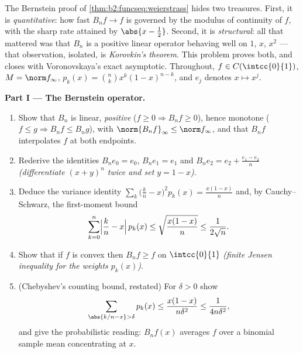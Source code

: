 \begin{problem}\label{pb:b2:funcseq:1}
The Bernstein proof of \cref{thm:b2:funcseq:weierstrass} hides
two treasures. First, it is \emph{quantitative}: how fast $B_nf
\to f$ is governed by the modulus of continuity of $f$, with the
sharp rate attained by $\abs{x - \frac12}$. Second, it is
\emph{structural}: all that mattered was that $B_n$ is a
positive linear operator behaving well on $1$, $x$, $x^2$ ---
that observation, isolated, is \emph{Korovkin's
theorem}. This problem proves both,
and closes with Voronovskaya's exact asymptotic. Throughout,
$f \in C(\intcc{0}{1})$, $M = \norm f_\infty$, $p_k(x) = \binom
nk x^k(1-x)^{n-k}$, and $e_j$ denotes $x \mapsto x^j$.

\medskip
\noindent\textbf{Part I --- The Bernstein operator.}
\begin{enumerate}
  \item Show that $B_n$ is linear, \emph{positive} ($f \geq 0
        \Rightarrow B_nf \geq 0$), hence monotone ($f \leq g
        \Rightarrow B_nf \leq B_ng$), with
        $\norm{B_nf}_\infty \leq \norm f_\infty$, and that
        $B_nf$ interpolates $f$ at both endpoints.
  \item Rederive the identities $B_n e_0 = e_0$, $B_n e_1 =
        e_1$ and $B_n e_2 = e_2 + \frac{e_1 - e_2}{n}$
        \emph{(differentiate $(x + y)^n$ twice and set $y = 1 -
        x$)}.
  \item Deduce the variance identity $\sum_k \bigl(\frac kn -
        x\bigr)^2 p_k(x) = \frac{x(1-x)}{n}$ and, by
        Cauchy--Schwarz, the first-moment bound
        \[
        \sum_{k=0}^{n}\Bigl|\frac kn - x\Bigr|\,p_k(x)
        \leq \sqrt{\frac{x(1-x)}{n}} \leq \frac{1}{2\sqrt n} .
        \]
  \item Show that if $f$ is convex then $B_nf \geq f$ on
        $\intcc{0}{1}$ \emph{(finite Jensen inequality for the
        weights $p_k(x)$)}.
  \item (Chebyshev's counting bound, restated) For $\delta > 0$
        show
        \[
        \sum_{\abs{k/n - x} > \delta} p_k(x)
        \leq \frac{x(1-x)}{n\delta^2}
        \leq \frac{1}{4n\delta^2} ,
        \]
        and give the probabilistic reading: $B_nf(x)$ averages
        $f$ over a binomial sample mean concentrating at $x$.
\end{enumerate}


\end{problem}
